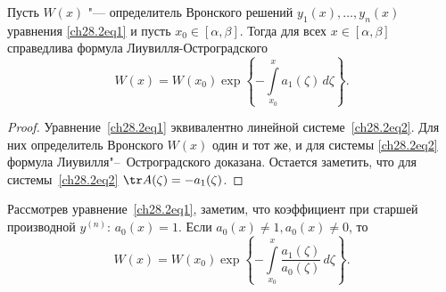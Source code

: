 \begin{thm}
Пусть $W(x)$ "--- определитель Вронского решений $y_1(x), \ldots, y_n(x)$ уравнения \eqref{ch28.2eq1} и пусть $x_0 \in [\alpha, \beta]$. Тогда для всех $x \in [\alpha, \beta]$ справедлива формула Лиувилля-Остроградского
$$
W(x) = W(x_0) \exp \left\lbrace - \int\limits_{x_0}^{x} a_1(\zeta) \,d\zeta \right\rbrace.
$$
\end{thm}

\begin{proof}
Уравнение~\eqref{ch28.2eq1} эквивалентно линейной системе~\eqref{ch28.2eq2}. Для них определитель Вронского $W(x)$ один и тот же, и для системы \eqref{ch28.2eq2} формула Лиувилля"--~Остроградского доказана. Остается заметить, что для системы~\eqref{ch28.2eq2} $\tr A(\zeta) = - a_1(\zeta)$.
\end{proof}

\begin{notion}
Рассмотрев уравнение~\eqref{ch28.2eq1}, заметим, что коэффициент при старшей производной $y^{(n)}$:  $a_0(x) = 1$. Если $a_0(x) \not= 1, a_0(x) \not= 0$, то 
$$
W(x) = W(x_0) \exp \left\lbrace - \int\limits_{x_0}^{x} \frac{a_1(\zeta)}{a_0(\zeta)} \,d\zeta \right\rbrace.
$$
\end{notion}

